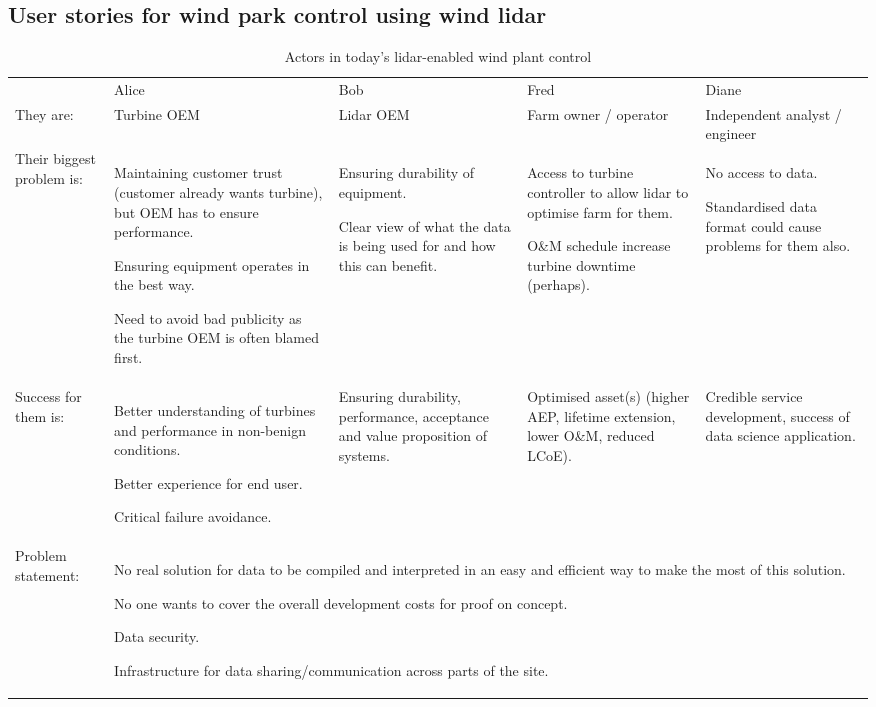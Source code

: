 \subsection*{User stories for wind park control using wind lidar}

\begin{table*}[!h]
    \centering
    \caption{Actors in today's lidar-enabled wind plant control}
    \begin{tabular}{@{}|p{}|p{}|p{}|p{}|p{}|@{}}
    \rowcolor{Task32Blue2} & 
        Alice &
        Bob & 
        Fred & 
        Diane \\
They are: & 
    Turbine OEM & 
    Lidar OEM & 
    Farm owner / operator &
    Independent analyst / engineer \\
Their biggest problem is: &
    Maintaining customer trust (customer already wants turbine), but OEM has to ensure performance. 
    
    Ensuring equipment operates in the best way.
    
    Need to avoid bad publicity as the turbine OEM is often blamed first. & 
    Ensuring durability of equipment.

    Clear view of what the data is being used for and how this can benefit. &
    Access to turbine controller to allow lidar to optimise farm for them.
    
    O\&M schedule increase turbine downtime (perhaps). &     
    No access to data.
    
    Standardised data format could cause problems for them also. \\
Success for them is: & 
    Better understanding of turbines and performance in non-benign conditions. 
    
    Better experience for end user. 
    
    Critical failure avoidance. &
    Ensuring durability, performance, acceptance and value proposition of systems. & 
    Optimised asset(s) (higher AEP, lifetime extension, lower O\&M, reduced LCoE). &
    Credible service development, success of data science application. \\
Problem statement: &
\multicolumn{4}{p{0.74\textwidth+6\tabcolsep+3\arrayrulewidth}}{No real solution for data to be compiled and interpreted in an easy and efficient way to make the most of this solution.

	No one wants to cover the overall development costs for proof on concept.

	Data security.

	Infrastructure for data sharing/communication across parts of the site.} \\
\end{tabular}
\label{tab:03_windPlantControl_now}
\end{table*}


